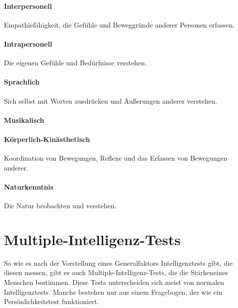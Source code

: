 \paragraph{Interpersonell}
Empathiefähigkeit, die Gefühle und Beweggründe anderer Personen erfassen.
\paragraph{Intrapersonell}
Die eigenen Gefühle und Bedürfnisse verstehen.
\paragraph{Sprachlich}
Sich selbst mit Worten ausdrücken und Äußerungen anderer verstehen.
\paragraph{Musikalisch}

\paragraph{Körperlich-Kinästhetisch}
Koordination von Bewegungen, Reflexe und das Erfassen von Bewegungen anderer.
\paragraph{Naturkenntnis}
Die Natur beobachten und verstehen.

\section{Multiple-Intelligenz-Tests}
So wie es nach der Vorstellung eines Generalfaktors Intelligenztests gibt, die diesen messen, gibt es auch Multiple-Intelligenz-Tests, die die \glqq Stärken\grqq eines Menschen bestimmen. Diese Tests unterscheiden sich meist von normalen Intelligenztests. Manche bestehen nur aus einem Fragebogen, der wie ein Persönlichkeitstest funktioniert.
